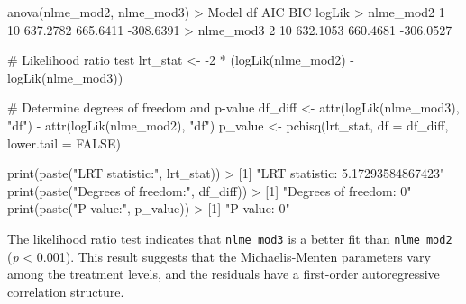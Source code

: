 \documentclass[
  letterpaper,
]{book}
\newenvironment{Shaded}{\begin{snugshade}}{\end{snugshade}}
\newcommand{\AttributeTok}[1]{\textcolor[rgb]{0.40,0.45,0.13}{#1}}
\newcommand{\CommentTok}[1]{\textcolor[rgb]{0.37,0.37,0.37}{#1}}
\newcommand{\ConstantTok}[1]{\textcolor[rgb]{0.56,0.35,0.01}{#1}}
\newcommand{\DecValTok}[1]{\textcolor[rgb]{0.68,0.00,0.00}{#1}}
\newcommand{\FloatTok}[1]{\textcolor[rgb]{0.68,0.00,0.00}{#1}}
\newcommand{\FunctionTok}[1]{\textcolor[rgb]{0.28,0.35,0.67}{#1}}
\newcommand{\NormalTok}[1]{\textcolor[rgb]{0.00,0.23,0.31}{#1}}
\newcommand{\OtherTok}[1]{\textcolor[rgb]{0.00,0.23,0.31}{#1}}
\newcommand{\SpecialCharTok}[1]{\textcolor[rgb]{0.37,0.37,0.37}{#1}}
\newcommand{\StringTok}[1]{\textcolor[rgb]{0.13,0.47,0.30}{#1}}
\begin{document}
\begin{Shaded}
\begin{Highlighting}[]
\FunctionTok{anova}\NormalTok{(nlme\_mod2, nlme\_mod3)}
\SpecialCharTok{\textgreater{}}\NormalTok{           Model df      AIC      BIC    logLik}
\SpecialCharTok{\textgreater{}}\NormalTok{ nlme\_mod2     }\DecValTok{1} \DecValTok{10} \FloatTok{637.2782} \FloatTok{665.6411} \SpecialCharTok{{-}}\FloatTok{308.6391}
\SpecialCharTok{\textgreater{}}\NormalTok{ nlme\_mod3     }\DecValTok{2} \DecValTok{10} \FloatTok{632.1053} \FloatTok{660.4681} \SpecialCharTok{{-}}\FloatTok{306.0527}

\CommentTok{\# Likelihood ratio test}
\NormalTok{lrt\_stat }\OtherTok{\textless{}{-}} \SpecialCharTok{{-}}\DecValTok{2} \SpecialCharTok{*}\NormalTok{ (}\FunctionTok{logLik}\NormalTok{(nlme\_mod2) }\SpecialCharTok{{-}} \FunctionTok{logLik}\NormalTok{(nlme\_mod3))}

\CommentTok{\# Determine degrees of freedom and p{-}value}
\NormalTok{df\_diff }\OtherTok{\textless{}{-}} \FunctionTok{attr}\NormalTok{(}\FunctionTok{logLik}\NormalTok{(nlme\_mod3), }\StringTok{"df"}\NormalTok{) }\SpecialCharTok{{-}} \FunctionTok{attr}\NormalTok{(}\FunctionTok{logLik}\NormalTok{(nlme\_mod2), }\StringTok{"df"}\NormalTok{) }
\NormalTok{p\_value }\OtherTok{\textless{}{-}} \FunctionTok{pchisq}\NormalTok{(lrt\_stat, }\AttributeTok{df =}\NormalTok{ df\_diff, }\AttributeTok{lower.tail =} \ConstantTok{FALSE}\NormalTok{) }

\FunctionTok{print}\NormalTok{(}\FunctionTok{paste}\NormalTok{(}\StringTok{"LRT statistic:"}\NormalTok{, lrt\_stat))}
\SpecialCharTok{\textgreater{}}\NormalTok{ [}\DecValTok{1}\NormalTok{] }\StringTok{"LRT statistic: 5.17293584867423"}
\FunctionTok{print}\NormalTok{(}\FunctionTok{paste}\NormalTok{(}\StringTok{"Degrees of freedom:"}\NormalTok{, df\_diff))}
\SpecialCharTok{\textgreater{}}\NormalTok{ [}\DecValTok{1}\NormalTok{] }\StringTok{"Degrees of freedom: 0"}
\FunctionTok{print}\NormalTok{(}\FunctionTok{paste}\NormalTok{(}\StringTok{"P{-}value:"}\NormalTok{, p\_value))}
\SpecialCharTok{\textgreater{}}\NormalTok{ [}\DecValTok{1}\NormalTok{] }\StringTok{"P{-}value: 0"}
\end{Highlighting}
\end{Shaded}

The likelihood ratio test indicates that \texttt{nlme\_mod3} is a better
fit than \texttt{nlme\_mod2} (\emph{p} \textless{} 0.001). This result
suggests that the Michaelis-Menten parameters vary among the treatment
levels, and the residuals have a first-order autoregressive correlation
structure.
\end{document}
